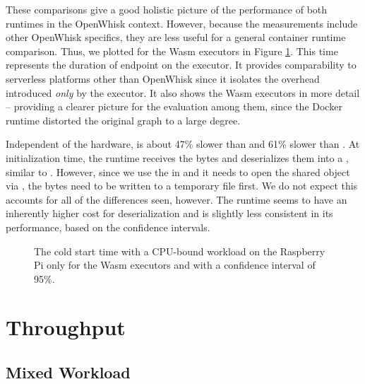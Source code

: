 These comparisons give a good holistic picture of the performance of both runtimes in the OpenWhisk context. However, because the measurements include other OpenWhisk specifics, they are less useful for a general container runtime comparison. Thus, we plotted  for the Wasm executors in Figure \ref{fig:pc-pi-cold-start-wasm-only}. This time represents the duration of  endpoint on the executor. It provides comparability to serverless platforms other than OpenWhisk since it isolates the overhead introduced \emph{only} by the executor. It also shows the Wasm executors in more detail -- providing a clearer picture for the evaluation among them, since the Docker runtime distorted the original graph to a large degree.

Independent of the hardware,  is about 47\% slower than  and 61\% slower than . At initialization time, the runtime receives the bytes and deserializes them into a , similar to . However, since we use the  in  and it needs to open the shared object via , the bytes need to be written to a temporary file first. We do not expect this accounts for all of the differences seen, however.
The runtime seems to have an inherently higher cost for deserialization and is slightly less consistent in its performance, based on the confidence intervals.

\begin{figure}
    \begin{center}
        
    \end{center}
    \caption{The cold start time with a CPU-bound workload on the Raspberry Pi only for the Wasm executors and with a confidence interval of 95\%.}
    \label{fig:pc-pi-cold-start-wasm-only}
\end{figure}



\section{Throughput}

\subsection{Mixed Workload}

